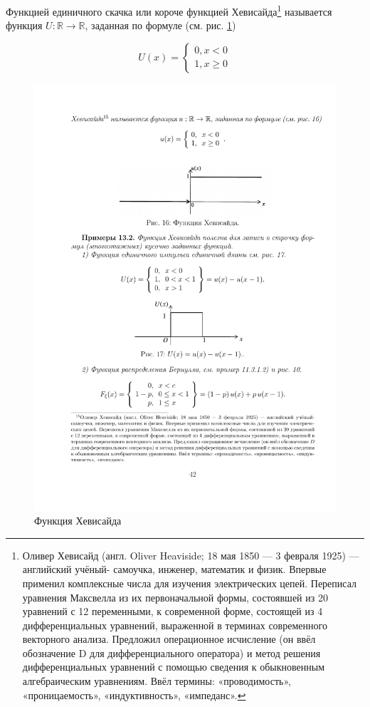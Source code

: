 \begin{theorem}
\label{th:13.1}
	Функцией единичного скачка или короче функцией
Хевисайда\footnote{Оливер Хевисайд (англ. Oliver Heaviside; 18 мая 1850 — 3 февраля 1925) — английский учёный-
самоучка, инженер, математик и физик. Впервые применил комплексные числа для изучения электрических цепей. Переписал уравнения Максвелла из их первоначальной формы, состоявшей из 20 уравнений
с 12 переменными, к современной форме, состоящей из 4 дифференциальных уравнений, выраженной в
терминах современного векторного анализа. Предложил операционное исчисление (он ввёл обозначение D
для дифференциального оператора) и метод решения дифференциальных уравнений с помощью сведения
к обыкновенным алгебраическим уравнениям. Ввёл термины: «проводимость», «проницаемость», «индуктивность», «импеданс».} называется функция $U : \mathbb{R}\rightarrow \mathbb{R}$, заданная по формуле (см. рис. \ref{fig16})

\begin{equation*}
U(x) = 
 \begin{cases}
   0,x<0\\
   1,x\geqslant 0 
 \end{cases}
\end{equation*}
\end{theorem}

\begin{figure}[H]
	\centering
	\includegraphics[]{pic/pic16}
	\caption{Функция Хевисайда}
	\label{fig16}
\end{figure}

